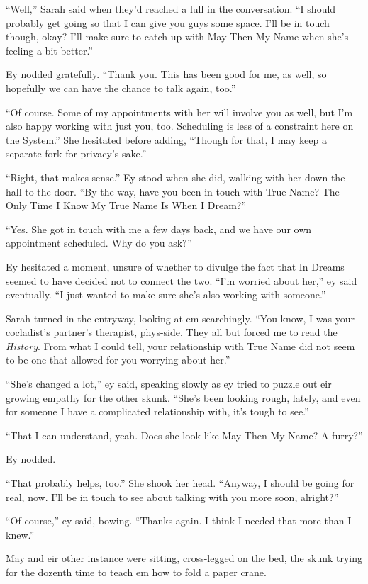 ``Well,'' Sarah said when they'd reached a lull in the conversation. ``I should probably get going so that I can give you guys some space. I'll be in touch though, okay? I'll make sure to catch up with May Then My Name when she's feeling a bit better.''

Ey nodded gratefully. ``Thank you. This has been good for me, as well, so hopefully we can have the chance to talk again, too.''

``Of course. Some of my appointments with her will involve you as well, but I'm also happy working with just you, too. Scheduling is less of a constraint here on the System.'' She hesitated before adding, ``Though for that, I may keep a separate fork for privacy's sake.''

``Right, that makes sense.'' Ey stood when she did, walking with her down the hall to the door. ``By the way, have you been in touch with True Name? The Only Time I Know My True Name Is When I Dream?''

``Yes. She got in touch with me a few days back, and we have our own appointment scheduled. Why do you ask?''

Ey hesitated a moment, unsure of whether to divulge the fact that In Dreams seemed to have decided not to connect the two. ``I'm worried about her,'' ey said eventually. ``I just wanted to make sure she's also working with someone.''

Sarah turned in the entryway, looking at em searchingly. ``You know, I was your cocladist's partner's therapist, phys-side. They all but forced me to read the \emph{History}. From what I could tell, your relationship with True Name did not seem to be one that allowed for you worrying about her.''

``She's changed a lot,'' ey said, speaking slowly as ey tried to puzzle out eir growing empathy for the other skunk. ``She's been looking rough, lately, and even for someone I have a complicated relationship with, it's tough to see.''

``That I can understand, yeah. Does she look like May Then My Name? A furry?''

Ey nodded.

``That probably helps, too.'' She shook her head. ``Anyway, I should be going for real, now. I'll be in touch to see about talking with you more soon, alright?''

``Of course,'' ey said, bowing. ``Thanks again. I think I needed that more than I knew.''

May and eir other instance were sitting, cross-legged on the bed, the skunk trying for the dozenth time to teach em how to fold a paper crane.

